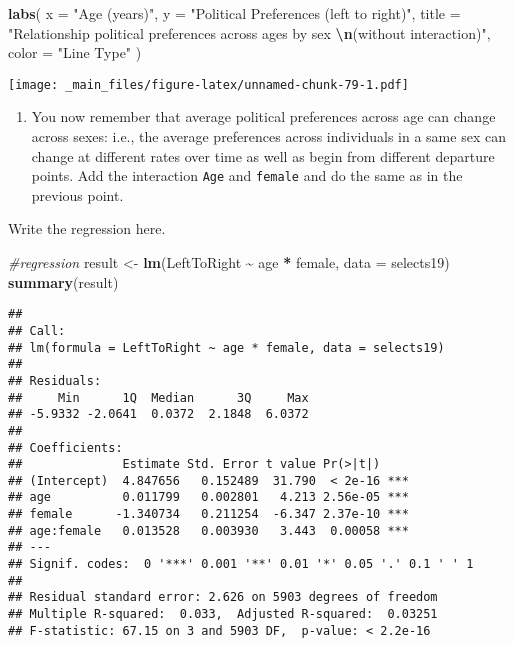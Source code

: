\documentclass[
]{book}
\newenvironment{Shaded}{\begin{snugshade}}{\end{snugshade}}
\newcommand{\AttributeTok}[1]{\textcolor[rgb]{0.13,0.29,0.53}{#1}}
\newcommand{\CommentTok}[1]{\textcolor[rgb]{0.56,0.35,0.01}{\textit{#1}}}
\newcommand{\FunctionTok}[1]{\textcolor[rgb]{0.13,0.29,0.53}{\textbf{#1}}}
\newcommand{\NormalTok}[1]{#1}
\newcommand{\OtherTok}[1]{\textcolor[rgb]{0.56,0.35,0.01}{#1}}
\newcommand{\SpecialCharTok}[1]{\textcolor[rgb]{0.81,0.36,0.00}{\textbf{#1}}}
\newcommand{\StringTok}[1]{\textcolor[rgb]{0.31,0.60,0.02}{#1}}
\providecommand{\tightlist}{%
  \setlength{\itemsep}{0pt}\setlength{\parskip}{0pt}}
\begin{document}
\begin{Shaded}
\begin{Highlighting}[]
  \FunctionTok{labs}\NormalTok{(}
    \AttributeTok{x =} \StringTok{"Age (years)"}\NormalTok{,}
    \AttributeTok{y =} \StringTok{"Political Preferences (left to right)"}\NormalTok{,}
    \AttributeTok{title =} \StringTok{"Relationship political preferences across ages by sex }\SpecialCharTok{\textbackslash{}n}\StringTok{(without interaction)"}\NormalTok{,}
    \AttributeTok{color =} \StringTok{"Line Type"}
\NormalTok{  )}
\end{Highlighting}
\end{Shaded}

\texttt{[image: \_main\_files/figure-latex/unnamed-chunk-79-1.pdf]}

\begin{enumerate}
\def\labelenumi{\arabic{enumi}.}
\setcounter{enumi}{4}
\tightlist
\item
  You now remember that average political preferences across age can change across sexes: i.e., the average preferences across individuals in a same sex can change at different rates over time as well as begin from different departure points. Add the interaction \texttt{Age} and \texttt{female} and do the same as in the previous point.
\end{enumerate}

Write the regression here.

\begin{Shaded}
\begin{Highlighting}[]
\CommentTok{\#regression}
\NormalTok{result }\OtherTok{\textless{}{-}} \FunctionTok{lm}\NormalTok{(LeftToRight }\SpecialCharTok{\textasciitilde{}}\NormalTok{ age }\SpecialCharTok{*}\NormalTok{ female, }\AttributeTok{data =}\NormalTok{ selects19)}
\FunctionTok{summary}\NormalTok{(result)}
\end{Highlighting}
\end{Shaded}

\begin{verbatim}
## 
## Call:
## lm(formula = LeftToRight ~ age * female, data = selects19)
## 
## Residuals:
##     Min      1Q  Median      3Q     Max 
## -5.9332 -2.0641  0.0372  2.1848  6.0372 
## 
## Coefficients:
##              Estimate Std. Error t value Pr(>|t|)    
## (Intercept)  4.847656   0.152489  31.790  < 2e-16 ***
## age          0.011799   0.002801   4.213 2.56e-05 ***
## female      -1.340734   0.211254  -6.347 2.37e-10 ***
## age:female   0.013528   0.003930   3.443  0.00058 ***
## ---
## Signif. codes:  0 '***' 0.001 '**' 0.01 '*' 0.05 '.' 0.1 ' ' 1
## 
## Residual standard error: 2.626 on 5903 degrees of freedom
## Multiple R-squared:  0.033,  Adjusted R-squared:  0.03251 
## F-statistic: 67.15 on 3 and 5903 DF,  p-value: < 2.2e-16
\end{verbatim}
\end{document}
